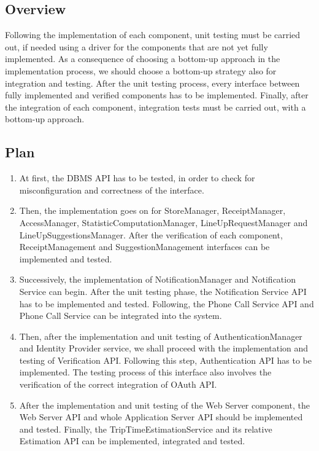 \documentclass[../../main.tex]{subfiles}
\begin{document}
\subsection{Overview}

Following the implementation of each component, unit testing must be carried out, if needed using a driver for the components that are not yet fully implemented. 
As a consequence of choosing a bottom-up approach in the implementation process, we should choose a bottom-up strategy also for integration and testing. 
After the unit testing process, every interface between fully implemented and verified components has to be implemented. 
Finally, after the integration of each component, integration tests must be carried out, with a bottom-up approach. 

\subsection{Plan}

\begin{enumerate}

	\item At first, the DBMS API has to be tested, in order to check for misconfiguration and correctness of the interface.

	\item Then, the implementation goes on for StoreManager, ReceiptManager, AccessManager, StatisticComputationManager, LineUpRequestManager and LineUpSuggestionsManager. 
	After the verification of each component, ReceiptManagement and SuggestionManagement interfaces can be implemented and tested.

	\item Successively, the implementation of NotificationManager and Notification Service can begin. 
	After the unit testing phase, the Notification Service API has to be implemented and tested. 
	Following, the Phone Call Service API and Phone Call Service can be integrated into the system.

	\item Then, after the implementation and unit testing of AuthenticationManager and Identity Provider service, we shall proceed with the implementation and testing of Verification API. 
	Following this step, Authentication API has to be implemented. The testing process of this interface also involves the verification of the correct integration of OAuth API.

	\item After the implementation and unit testing of the Web Server component, the Web Server API and whole Application Server API should be implemented and tested. 
	Finally, the TripTimeEstimationService and its relative Estimation API can be implemented, integrated and tested.

\end{enumerate}
\end{document}
